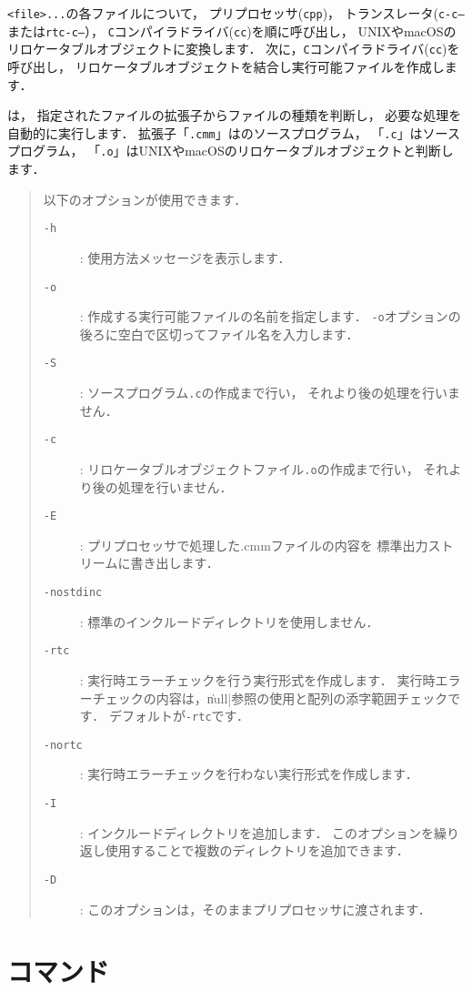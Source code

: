{\tt <file>...}の各ファイルについて，
プリプロセッサ({\tt cpp})，
トランスレータ({\tt c-c--}または{\tt rtc-c--}），
{\tt C}コンパイラドライバ({\tt cc})を順に呼び出し，
UNIXやmacOSのリロケータブルオブジェクトに変換します．
次に，{\tt C}コンパイラドライバ({\tt cc})を呼び出し，
リロケータブルオブジェクトを結合し実行可能ファイルを作成します．

{\cmc}は，
指定されたファイルの拡張子からファイルの種類を判断し，
必要な処理を自動的に実行します．
拡張子「{\tt .cmm}」は{\cmml}のソースプログラム，
「{\tt .c}」は{\cl}ソースプログラム，
「{\tt .o}」はUNIXやmacOSのリロケータブルオブジェクトと判断します．

\begin{quote}
\hspace{-1em}以下のオプションが使用できます．

\begin{description}
\item[{\tt -h}] : 使用方法メッセージを表示します．
\item[{\tt -o}] : 作成する実行可能ファイルの名前を指定します．
{\tt -o}オプションの後ろに空白で区切ってファイル名を入力します．
\item[{\tt -S}] : {\cl}ソースプログラム{\tt .c}の作成まで行い，
  それより後の処理を行いません．
\item[{\tt -c}] : リロケータブルオブジェクトファイル{\tt .o}の作成まで行い，
  それより後の処理を行いません．
\item[{\tt -E}] : プリプロセッサで処理した{.cmm}ファイルの内容を
  標準出力ストリームに書き出します．
\item[{\tt -nostdinc}] : 標準のインクルードディレクトリを使用しません．
\item[{\tt -rtc}] : 実行時エラーチェックを行う実行形式を作成します．
  実行時エラーチェックの内容は，\|null|参照の使用と配列の添字範囲チェックです．
  デフォルトが{\tt -rtc}です．
\item[{\tt -nortc}] : 実行時エラーチェックを行わない実行形式を作成します．
\item[{\tt -I}] : インクルードディレクトリを追加します．
  このオプションを繰り返し使用することで複数のディレクトリを追加できます．
\item[{\tt -D}] : このオプションは，そのままプリプロセッサに渡されます．
\end{description}
\end{quote}

\section{{\cmi}コマンド}

